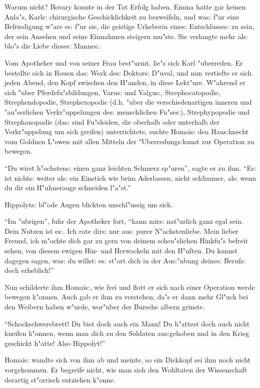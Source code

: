 \documentclass[oneside,12pt]{book}
\newcommand{\s}{s:}%
\begin{document}
Warum nicht? Bovary konnte in der Tat Erfolg haben. Emma hatte gar
keinen Anla"s, Karl{\s} chirurgische Geschicklichkeit zu
bezweifeln, und wa{\s} f"ur eine Befriedigung w"are e{\s} f"ur
sie, die geistige Urheberin eine{\s} Entschlusse{\s} zu sein, der
sein Ansehen und seine Einnahmen steigern mu"ste. Sie verlangte
mehr al{\s} blo"s die Liebe diese{\s} Manne{\s}.

Vom Apotheker und von seiner Frau best"urmt, lie"s sich Karl
"uberreden. Er bestellte sich in Rouen da{\s} Werk de{\s}
Doktor{\s} D"uval, und nun vertiefte er sich jeden Abend, den Kopf
zwischen den H"anden, in diese Lekt"ure. W"ahrend er sich "uber
Pferdefu"sbildungen, Varu{\s} und Valgu{\s}, Strephocatopodie,
Strephendopodie, Strephexopodie (d.h. "uber die verschiedenartigen
inneren und "au"serlichen Verkr"uppelungen de{\s} menschlichen
Fu"se{\s}), Strephypopodie und Strephanopodie (da{\s} sind
Fu"sleiden, die oberhalb oder unterhalb der Verkr"uppelung um sich
greifen) unterrichtete, suchte Homai{\s} den Hau{\s}knecht vom
Goldnen L"owen mit allen Mitteln der "Uberredung{\s}kunst zur
Operation zu bewegen.

"`Du wirst h"ochsten{\s} einen ganz leichten Schmerz sp"uren"',
sagte er zu ihm. "`E{\s} ist nicht{\s} weiter al{\s} ein Einstich
wie beim Aderlassen, nicht schlimmer, al{\s} wenn du dir ein
H"uhnerauge schneiden l"a"st."'

Hippolyt{\s} bl"ode Augen blickten unschl"ussig um sich.

"`Im "ubrigen"', fuhr der Apotheker fort, "`kann mir{\s}
nat"urlich ganz egal sein. Dein Nutzen ist e{\s}. Ich rate dir{\s}
nur au{\s} purer N"achstenliebe. Mein lieber Freund, ich m"ochte
dich gar zu gern von deinem scheu"slichen Hinkfu"s befreit sehen,
von diesem ewigen Hin- und Herwackeln mit den H"uften. Du kannst
dagegen sagen, wa{\s} du willst: e{\s} st"ort dich in der
Au{\s}"ubung deine{\s} Beruf{\s} doch erheblich!"'

Nun schilderte ihm Homai{\s}, wie frei und flott er sich nach
einer Operation werde bewegen k"onnen. Auch gab er ihm zu
verstehen, da"s er dann mehr Gl"uck bei den Weibern haben w"urde,
wor"uber der Bursche albern grinste.

"`Schockschwerebrett! Du bist doch auch ein Mann! Du h"attest doch
auch nicht kneifen k"onnen, wenn man dich zu den Soldaten
au{\s}gehoben und in den Krieg geschickt h"atte! Also Hippolyt!"'

Homai{\s} wandte sich von ihm ab und meinte, so ein Dickkopf sei
ihm noch nicht vorgekommen. Er begreife nicht, wie man sich den
Wohltaten der Wissenschaft derartig st"orrisch ent\/ziehen k"onne.
\end{document}
